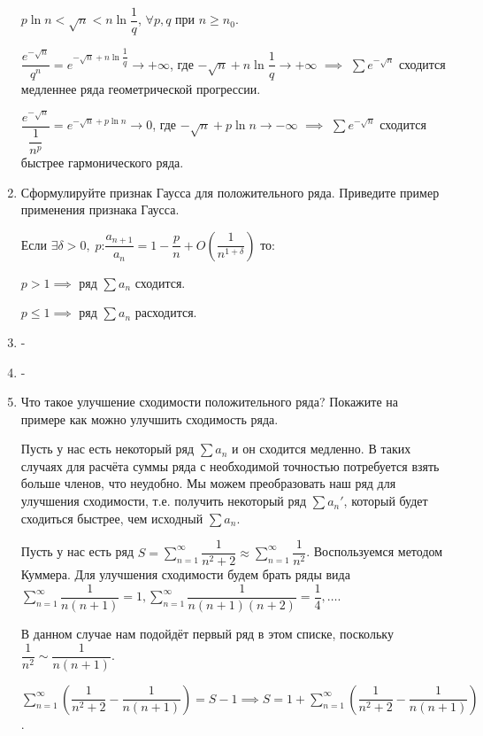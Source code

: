 \documentclass[a4paper]{article}
\begin{document}
\begin{enumerate}
        $p \ln n < \sqrt{n} < n \ln \dfrac{1}{q}$, $\forall p, q$ при $n \geqslant n_0$. 
        
        $\dfrac{e^{-\sqrt{n}}}{q^n} = e^{-\sqrt{n} + n \ln \dfrac{1}{q}} \rightarrow +\infty$, где $-\sqrt{n} + n \ln \dfrac{1}{q} \rightarrow + \infty$ $\implies$ $\sum e^{-\sqrt{n}}$ сходится медленнее ряда геометрической прогрессии.
        
        $\dfrac{e^{-\sqrt{n}}}{\dfrac{1}{n^p}} = e^{-\sqrt{n} + p \ln n} \rightarrow 0$, где $-\sqrt{n} + p \ln n \rightarrow -\infty$ $\implies$ $\sum e^{-\sqrt{n}}$ сходится быстрее гармонического ряда.
        
        \item Сформулируйте признак Гаусса для положительного ряда. Приведите пример применения признака Гаусса.

        Если $\exists \delta > 0,\; p$:$ \dfrac{a_{n+1}}{a_n} = 1 - \dfrac{p}{n} + O\left(\dfrac{1}{n^{1 + \delta}}\right) $
        то:

        $p > 1 \implies$ ряд $\sum a_n$ сходится.

        $p \leq 1 \implies$ ряд $\sum a_n$ расходится.
        \item -
        \item -
        \item Что такое улучшение сходимости положительного ряда? Покажите на примере как можно улучшить сходимость ряда.

        Пусть у нас есть некоторый ряд $\sum a_n$ и он сходится медленно. В таких случаях для расчёта суммы ряда с необходимой точностью потребуется взять больше членов, что неудобно. Мы можем преобразовать наш ряд для улучшения сходимости, т.е. получить некоторый ряд $\sum a_n'$, который будет сходиться быстрее, чем исходный $\sum a_n$.
       	\begin{example}
            Пусть у нас есть ряд $S = \sum_{n = 1}^{\infty} \dfrac{1}{n^2 + 2} \approx \sum_{n = 1}^{\infty} \dfrac{1}{n^2}$. Воспользуемся  методом Куммера. Для улучшения сходимости будем брать ряды вида $\sum_{n = 1}^{\infty} \dfrac{1}{n(n+1)} = 1, \sum_{n = 1}^{\infty} \dfrac{1}{n(n+1)(n+2)} = \dfrac{1}{4}, \dots$. 
            
            В данном случае нам подойдёт первый ряд в этом списке, поскольку $\dfrac{1}{n^2} \sim \dfrac{1}{n(n+1)}$.
            
            $\sum_{n = 1}^{\infty} \left( \dfrac{1}{n^2 + 2} - \dfrac{1}{n(n + 1)} \right) = S - 1 \implies S = 1 + \sum_{n = 1}^{\infty} \left( \dfrac{1}{n^2 + 2} - \dfrac{1}{n(n + 1)} \right)$.
             

\end{example}
\end{enumerate}
\end{document}
